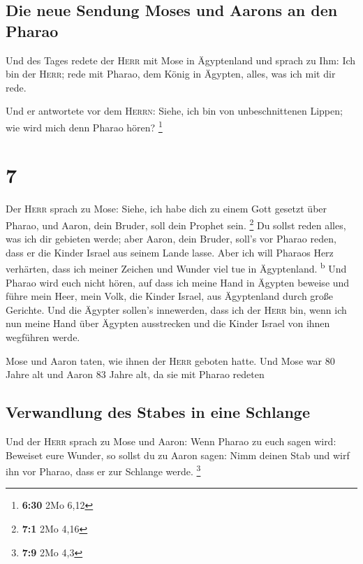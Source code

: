 \hypertarget{die-neue-sendung-moses-und-aarons-an-den-pharao}{%
\subsection{Die neue Sendung Moses und Aarons an den
Pharao}\label{die-neue-sendung-moses-und-aarons-an-den-pharao}}

 Und des Tages redete der \textsc{Herr} mit Mose in
Ägyptenland  und sprach zu Ihm: Ich bin der
\textsc{Herr}; rede mit Pharao, dem König in Ägypten, alles, was ich mit
dir rede.

 Und er antwortete vor dem \textsc{Herrn}: Siehe, ich bin
von unbeschnittenen Lippen; wie wird mich denn Pharao hören? \footnote{\textbf{6:30}
  2Mo 6,12}

\hypertarget{section-6}{%
\section{7}\label{section-6}}

 Der \textsc{Herr} sprach zu Mose: Siehe, ich habe dich zu
einem Gott gesetzt über Pharao, und Aaron, dein Bruder, soll dein
Prophet sein. \footnote{\textbf{7:1} 2Mo 4,16}  Du sollst
reden alles, was ich dir gebieten werde; aber Aaron, dein Bruder, soll's
vor Pharao reden, dass er die Kinder Israel aus seinem Lande lasse.
 Aber ich will Pharaos Herz verhärten, dass ich meiner
Zeichen und Wunder viel tue in Ägyptenland. \textsuperscript{b}
 Und Pharao wird euch nicht hören, auf dass ich meine Hand
in Ägypten beweise und führe mein Heer, mein Volk, die Kinder Israel,
aus Ägyptenland durch große Gerichte.  Und die Ägypter
sollen's innewerden, dass ich der \textsc{Herr} bin, wenn ich nun meine
Hand über Ägypten ausstrecken und die Kinder Israel von ihnen wegführen
werde.

 Mose und Aaron taten, wie ihnen der \textsc{Herr} geboten
hatte.  Und Mose war 80 Jahre alt und Aaron 83 Jahre alt,
da sie mit Pharao redeten

\hypertarget{verwandlung-des-stabes-in-eine-schlange}{%
\subsection{Verwandlung des Stabes in eine
Schlange}\label{verwandlung-des-stabes-in-eine-schlange}}

 Und der \textsc{Herr} sprach zu Mose und Aaron:
 Wenn Pharao zu euch sagen wird: Beweiset eure Wunder, so
sollst du zu Aaron sagen: Nimm deinen Stab und wirf ihn vor Pharao, dass
er zur Schlange werde. \footnote{\textbf{7:9} 2Mo 4,3}

